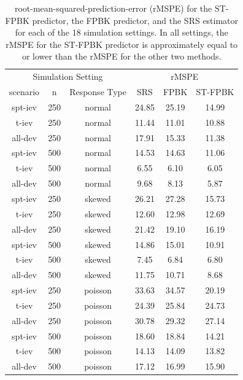 \documentclass[smallextended]{svjour3}       %
\begin{document}
\begin{table}[H]

\caption{\label{tab:simrmspetab}root-mean-squared-prediction-error (rMSPE) for the ST-FPBK predictor, the FPBK predictor, and the SRS estimator for each of the 18 simulation settings. In all settings, the rMSPE for the ST-FPBK predictor is approximately equal to or lower than the rMSPE for the other two methods.}
\centering
\begin{tabular}[t]{cccccc}
\toprule
\multicolumn{3}{c}{Simulation Setting} & \multicolumn{3}{c}{rMSPE} \\
\cmidrule(l{3pt}r{3pt}){1-3} \cmidrule(l{3pt}r{3pt}){4-6}
scenario & n & Response Type & SRS & FPBK & ST-FPBK\\
\midrule
spt-iev & 250 & normal & 24.85 & 25.19 & 14.99\\
t-iev & 250 & normal & 11.44 & 11.01 & 10.88\\
all-dev & 250 & normal & 17.91 & 15.33 & 11.38\\
\midrule
spt-iev & 500 & normal & 14.53 & 14.63 & 11.06\\
t-iev & 500 & normal & 6.55 & 6.10 & 6.05\\
all-dev & 500 & normal & 9.68 & 8.13 & 5.87\\
\midrule
spt-iev & 250 & skewed & 26.21 & 27.28 & 15.73\\
t-iev & 250 & skewed & 12.60 & 12.98 & 12.69\\
all-dev & 250 & skewed & 21.42 & 19.10 & 16.19\\
\midrule
spt-iev & 500 & skewed & 14.86 & 15.01 & 10.91\\
t-iev & 500 & skewed & 7.45 & 6.84 & 6.80\\
all-dev & 500 & skewed & 11.75 & 10.71 & 8.68\\
\midrule
spt-iev & 250 & poisson & 33.63 & 34.57 & 20.19\\
t-iev & 250 & poisson & 24.39 & 25.84 & 24.73\\
all-dev & 250 & poisson & 30.78 & 29.32 & 27.14\\
\midrule
spt-iev & 500 & poisson & 18.60 & 18.84 & 14.21\\
t-iev & 500 & poisson & 14.13 & 14.09 & 13.82\\
all-dev & 500 & poisson & 17.12 & 16.99 & 15.90\\
\bottomrule
\end{tabular}
\end{table}
\end{document}
